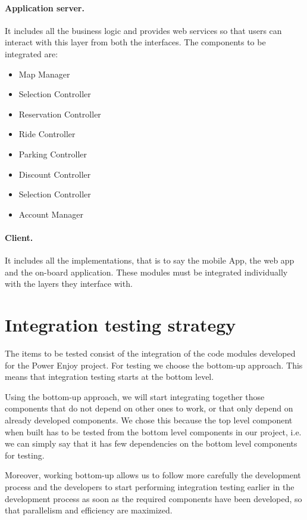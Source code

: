 \paragraph{Application server.} It includes all the business logic and provides web services so that users can interact with this layer from both the interfaces. The components to be integrated are:
\begin{itemize}
	\item Map Manager
	\item Selection Controller
	\item Reservation Controller
	\item Ride Controller
	\item Parking Controller
	\item Discount Controller
	\item Selection Controller
	\item Account Manager
\end{itemize}

\paragraph{Client.} It includes all the implementations, that is to say the mobile App, the web app and the on-board application. These modules must be integrated
individually with the layers they interface with.

\section{Integration testing strategy}
The items to be tested consist of the integration of the code modules developed for the Power Enjoy project. For testing we choose the bottom-up approach. This means that integration testing starts at the bottom level.

Using the bottom-up approach, we will start integrating together those components that do not depend on other ones to work, or that only depend on already developed components. We chose this because the top level component when built has to be tested from the bottom level components in our project, i.e. we can simply say that it has few dependencies on the bottom level components for testing.

Moreover, working bottom-up allows us to follow more carefully the development process and the developers to start performing integration testing earlier in the development process as soon as the required components have been developed, so that parallelism and efficiency are maximized.

